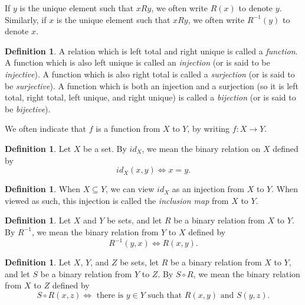 \documentclass[letterpaper]{article}
\theoremstyle{definition}
\newtheorem{definition}[theorem]{Definition}
\newcommand{\defterm}{\emph}
\renewcommand{\subset}{\subseteq}
\newcommand{\inverse}[1]{{#1^{-1}}}
\newcommand{\compose}{\circ}
\begin{document}
If \(y\) is the unique element such that \(x R y\), we often write
\(R(x)\) to denote \(y\).  Similarly, if \(x\) is the unique element
such that \(xRy\), we often write \(\inverse{R}(y)\) to denote \(x\).

\begin{definition}
  A relation which is left total and right unique is called a
  \defterm{function}.  A function which is also left unique is called
  an \defterm{injection} (or is said to be \defterm{injective}).  A
  function which is also right total is called a \defterm{surjection}
  (or is said to be \defterm{surjective}).  A function which is both
  an injection and a surjection (so it is left total, right total,
  left unique, and right unique) is called a \defterm{bijection} (or
  is said to be \defterm{bijective}).
\end{definition}

We often indicate that \(f\) is a function from \(X\) to \(Y\), by
writing \(f:X \to Y\).

\begin{definition}
  Let \(X\) be a set.  By \(id_X\), we mean the binary relation on
  \(X\) defined by
  \[id_X(x,y) \iff x = y \text{.}\]
\end{definition}

\begin{definition}
  When \(X \subset Y\), we can view \(id_X\) as an injection from
  \(X\) to \(Y\).  When viewed as such, this injection is called the
  \defterm{inclusion map} from \(X\) to \(Y\).
\end{definition}

\begin{definition}
  Let \(X\) and \(Y\) be sets, and let \(R\) be a binary relation from
  \(X\) to \(Y\).  By \(\inverse{R}\), we mean the binary relation
  from \(Y\) to \(X\) defined by
  \[\inverse{R}(y,x) \iff R(x,y) \text{.}\]
\end{definition}

\begin{definition}
  Let \(X\), \(Y\), and \(Z\) be sets, let \(R\) be a binary relation
  from \(X\) to \(Y\), and let \(S\) be a binary relation from \(Y\)
  to \(Z\).  By \(S \compose R\), we mean the binary relation from
  \(X\) to \(Z\) defined by
  \[S \compose R(x,z) \iff \text{ there is } y \in Y \text{ such that } R(x,y) \text{ and } S(y,z) \text{.}\]
\end{definition}
\end{document}
